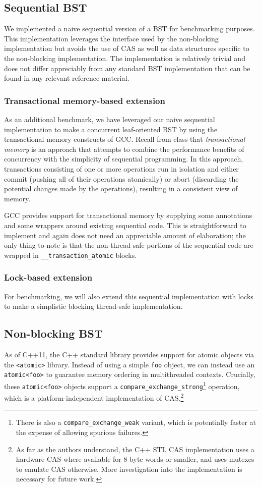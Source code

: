 \documentclass[10pt,pdftex,a4paper]{article}%
\begin{document}
\begin{multicols}{2}
\subsection{Sequential BST}
We implemented a naive sequential version of a BST for benchmarking purposes.  This implementation leverages the interface used by the non-blocking implementation but avoids the use of CAS as well as data structures specific to the non-blocking implementation.  The implementation is relatively trivial and does not differ appreciably from any standard BST implementation that can be found in any relevant reference material.

\subsubsection{Transactional memory-based extension}
As an additional benchmark, we have leveraged our naive sequential implementation to make a concurrent leaf-oriented BST by using the transactional memory constructs of GCC. Recall from class that \textit{transactional memory} is an approach that attempts to combine the performance benefits of concurrency with the simplicity of sequential programming.  In this approach, transactions consisting of one or more operations run in isolation and either commit (pushing all of their operations atomically) or abort (discarding the potential changes made by the operations), resulting in a consistent view of memory.

GCC provides support for transactional memory by supplying some annotations and some wrappers around existing sequential code.  This is straightforward to implement and again does not need an appreciable amount of elaboration; the only thing to note is that the non-thread-safe portions of the sequential code are wrapped in \texttt{\_\_transaction\_atomic} blocks.

\subsubsection{Lock-based extension}
For benchmarking, we will also extend this sequential implementation with locks to make a simplistic blocking thread-safe implementation.

\subsection{Non-blocking BST}
As of C++11, the C++ standard library provides support for atomic objects via the \texttt{<atomic>} library.  Instead of using a simple \texttt{foo} object, we can instead use an \texttt{atomic<foo>} to guarantee memory ordering in multithreaded contexts.  Crucially, these \texttt{atomic<foo>} objects support a \texttt{compare\_exchange\_strong}\footnote{There is also a \texttt{compare\_exchange\_weak} variant, which is potentially faster at the expense of allowing spurious failures.} operation, which is a platform-independent implementation of CAS.\footnote{As far as the authors understand, the C++ STL CAS implementation uses a hardware CAS where available for 8-byte words or smaller, and uses mutexes to emulate CAS otherwise.  More investigation into the implementation is necessary for future work.}


\end{multicols}
\end{document}
